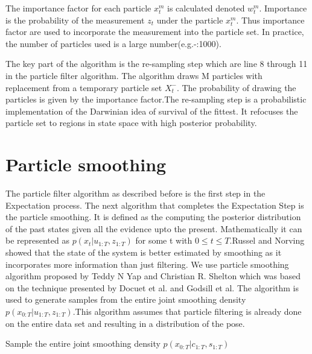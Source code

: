 \documentclass[12pt]{dalcsthesis}
\begin{document}
The importance factor for each particle $x_{t}^{m}$ is calculated denoted $w_{t}^{m}$. Importance is the probability of the measurement $z_{t}$ under the particle $x_{t}^{m}$. Thus importance factor are used to incorporate the measurement into the particle set. In practice, the number of particles used is a large number(e.g.-:1000).

The key part of the algorithm is the re-sampling step which are line 8 through 11 in the particle filter algorithm. The algorithm draws M particles with replacement from a temporary particle set $X_{t}^{-}$. The probability of drawing the particles is given by the importance factor.The re-sampling step is a probabilistic implementation of the Darwinian idea of survival of the fittest. It refocuses the particle set to regions in state space with high posterior probability. 

 \section{Particle smoothing}
The particle filter algorithm as described before is the first step in the Expectation process. The next algorithm that completes the Expectation Step is the particle smoothing. It is defined as the computing the posterior distribution of the past states given all the evidence upto the present.
Mathematically it can be represented as $p(x _{t}|u _{1:T},z _{1:T})$ for some t with $ 0 \leq t \leq T$.Russel and Norving showed that the state of the system is better estimated by smoothing as it incorporates more information than just filtering.
We use particle smoothing algorithm proposed by Teddy N Yap and Christian R. Shelton which was based on the technique presented by Docuet et al. and Godsill et al. The algorithm is used to generate samples from the entire joint smoothing density $p(x_{0:T}|u_{1:T},z_{1:T})$.This algorithm assumes that particle filtering is already done on the entire data set and resulting in a distribution of the pose.
\begin{algorithm}[H]
 \SetAlgoLined
  	\label{alg:Particle Smoothing}
	\caption{Sample the entire joint smoothing density $p(x_{0:T}|c_{1:T},s_{1:T})$}
	
\end{algorithm}
\end{document}

